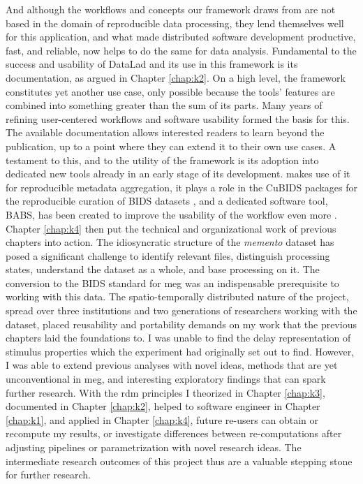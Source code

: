 And although the workflows and concepts our framework draws from are not based in the domain of reproducible data processing, they lend themselves well for this application, and what made distributed software development productive, fast, and reliable, now helps to do the same for data analysis.
Fundamental to the success and usability of DataLad and its use in this framework is its documentation, as argued in Chapter \ref{chap:k2}.
On a high level, the framework constitutes yet another use case, only possible because the tools' features are combined into something greater than the sum of its parts.
Many years of refining user-centered workflows and software usability formed the basis for this.
The available documentation allows interested readers to learn beyond the publication, up to a point where they can extend it to their own use cases.
A testament to this, and to the utility of the framework is its adoption into dedicated new tools already in an early stage of its development.
\citet{heunis2023catalog} makes use of it for reproducible metadata aggregation, it plays a role in the CuBIDS packages for the reproducible curation of \gls{BIDS} datasets \citep{covitz2022curation}, and a dedicated software tool, BABS, has been created to improve the usability of the workflow even more \citep{zhao2023reproducible}.\\
Chapter \ref{chap:k4} then put the technical and organizational work of previous chapters into action.
The idiosyncratic structure of the \textit{memento} dataset has posed a significant challenge to identify relevant files, distinguish processing states, understand the dataset as a whole, and base processing on it.
The conversion to the \gls{BIDS} standard for \gls{meg} was an indispensable prerequisite to working with this data.
The spatio-temporally distributed nature of the project, spread over three institutions and two generations of researchers working with the dataset, placed reusability and portability demands on my work that the previous chapters laid the foundations to.
I was unable to find the delay representation of stimulus properties which the experiment had originally set out to find.
However, I was able to extend previous analyses with novel ideas, methods that are yet unconventional in \gls{meg}, and interesting exploratory findings that can spark further research.
With the \gls{rdm} principles I theorized in Chapter \ref{chap:k3}, documented in Chapter \ref{chap:k2}, helped to software engineer in Chapter \ref{chap:k1}, and applied in Chapter \ref{chap:k4}, future re-users can obtain or recompute my results, or investigate differences between re-computations after adjusting pipelines or parametrization with novel research ideas.
The intermediate research outcomes of this project thus are a valuable stepping stone for further research.





